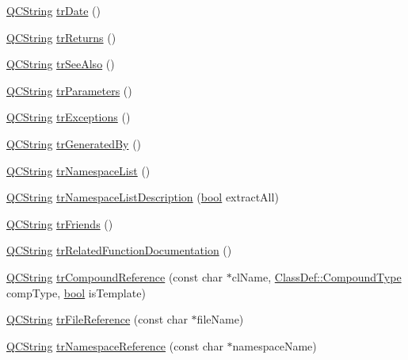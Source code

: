 \begin{DoxyCompactItemize}
\item 
\hyperlink{class_q_c_string}{Q\+C\+String} \hyperlink{class_translator_polish_a3e7bf0ac2c5231a890e4f4ad557834d0}{tr\+Date} ()
\item 
\hyperlink{class_q_c_string}{Q\+C\+String} \hyperlink{class_translator_polish_a2afd1448fafe6413751b7edc5086e24d}{tr\+Returns} ()
\item 
\hyperlink{class_q_c_string}{Q\+C\+String} \hyperlink{class_translator_polish_a1723e67cd770fb5becba21fb81a7e6f0}{tr\+See\+Also} ()
\item 
\hyperlink{class_q_c_string}{Q\+C\+String} \hyperlink{class_translator_polish_a0ddbafd02dba272771f9e332c74d5053}{tr\+Parameters} ()
\item 
\hyperlink{class_q_c_string}{Q\+C\+String} \hyperlink{class_translator_polish_a3aa24750d30c7cb91e001aa2a45d409a}{tr\+Exceptions} ()
\item 
\hyperlink{class_q_c_string}{Q\+C\+String} \hyperlink{class_translator_polish_aeb244cad8c4c8b6bd1e991a4a5507852}{tr\+Generated\+By} ()
\item 
\hyperlink{class_q_c_string}{Q\+C\+String} \hyperlink{class_translator_polish_a5a4beabb336dbbb60ca4673bcac08b7f}{tr\+Namespace\+List} ()
\item 
\hyperlink{class_q_c_string}{Q\+C\+String} \hyperlink{class_translator_polish_a3a8f74b8c29e0b30a9141b8c429745c3}{tr\+Namespace\+List\+Description} (\hyperlink{qglobal_8h_a1062901a7428fdd9c7f180f5e01ea056}{bool} extract\+All)
\item 
\hyperlink{class_q_c_string}{Q\+C\+String} \hyperlink{class_translator_polish_a61ee64087632405298cd2fd92615baa7}{tr\+Friends} ()
\item 
\hyperlink{class_q_c_string}{Q\+C\+String} \hyperlink{class_translator_polish_a7fa3c196cf1611345ada1a3f7a2f523f}{tr\+Related\+Function\+Documentation} ()
\item 
\hyperlink{class_q_c_string}{Q\+C\+String} \hyperlink{class_translator_polish_aa197df64fa1533b150f893d023981675}{tr\+Compound\+Reference} (const char $\ast$cl\+Name, \hyperlink{class_class_def_ae70cf86d35fe954a94c566fbcfc87939}{Class\+Def\+::\+Compound\+Type} comp\+Type, \hyperlink{qglobal_8h_a1062901a7428fdd9c7f180f5e01ea056}{bool} is\+Template)
\item 
\hyperlink{class_q_c_string}{Q\+C\+String} \hyperlink{class_translator_polish_a48b145d50b8529cb0164837701064360}{tr\+File\+Reference} (const char $\ast$file\+Name)
\item 
\hyperlink{class_q_c_string}{Q\+C\+String} \hyperlink{class_translator_polish_ad6178061269bdf4a4f9c948e1e5c560c}{tr\+Namespace\+Reference} (const char $\ast$namespace\+Name)

\end{DoxyCompactItemize}
